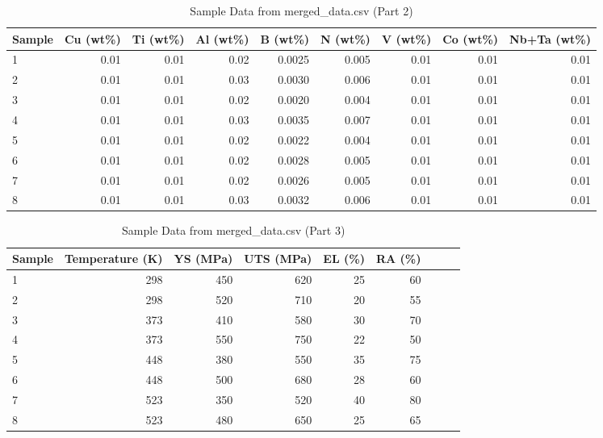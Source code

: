 \documentclass[10pt]{article}
\begin{document}
\begin{table}[htbp]
\centering
\caption{Sample Data from merged\_data.csv (Part 2)}
\label{tab:sample_data_part2}
\begin{tabular}{lrrrrrrrr}
\toprule
Sample & Cu (wt\%) & Ti (wt\%) & Al (wt\%) & B (wt\%) & N (wt\%) & V (wt\%) & Co (wt\%) & Nb+Ta (wt\%) \\
\midrule
1 & 0.01 & 0.01 & 0.02 & 0.0025 & 0.005 & 0.01 & 0.01 & 0.01 \\
2 & 0.01 & 0.01 & 0.03 & 0.0030 & 0.006 & 0.01 & 0.01 & 0.01 \\
3 & 0.01 & 0.01 & 0.02 & 0.0020 & 0.004 & 0.01 & 0.01 & 0.01 \\
4 & 0.01 & 0.01 & 0.03 & 0.0035 & 0.007 & 0.01 & 0.01 & 0.01 \\
5 & 0.01 & 0.01 & 0.02 & 0.0022 & 0.004 & 0.01 & 0.01 & 0.01 \\
6 & 0.01 & 0.01 & 0.02 & 0.0028 & 0.005 & 0.01 & 0.01 & 0.01 \\
7 & 0.01 & 0.01 & 0.02 & 0.0026 & 0.005 & 0.01 & 0.01 & 0.01 \\
8 & 0.01 & 0.01 & 0.03 & 0.0032 & 0.006 & 0.01 & 0.01 & 0.01 \\
\bottomrule
\end{tabular}
\end{table}

\begin{table}[htbp]
\centering
\caption{Sample Data from merged\_data.csv (Part 3)}
\label{tab:sample_data_part3}
\begin{tabular}{lrrrrrrrr}
\toprule
Sample & Temperature (K) & YS (MPa) & UTS (MPa) & EL (\%) & RA (\%) \\
\midrule
1 & 298 & 450 & 620 & 25 & 60 \\
2 & 298 & 520 & 710 & 20 & 55 \\
3 & 373 & 410 & 580 & 30 & 70 \\
4 & 373 & 550 & 750 & 22 & 50 \\
5 & 448 & 380 & 550 & 35 & 75 \\
6 & 448 & 500 & 680 & 28 & 60 \\
7 & 523 & 350 & 520 & 40 & 80 \\
8 & 523 & 480 & 650 & 25 & 65 \\
\bottomrule
\end{tabular}
\end{table}
\end{document}
